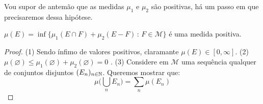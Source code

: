 \begin{problem}
    \label{prob:l1:4}
\end{problem}

Vou supor de antemão que as medidas $\mu_1$ e $\mu_2$ são positivas, há um passo em que precisaremos dessa hipótese.
\begin{prop}
    $\mu(E) = \inf \{\mu_1(E \cap F) +  \mu_2(E - F) \, : \, F \in \mathcal{M}\}$ é uma medida positiva.
\end{prop}
\begin{proof}
    (1) Sendo ínfimo de valores positivos, claramante $\mu(E) \in [0,\infty]$. (2) $\mu(\varnothing) \leq \mu_1(\varnothing) + \mu_2(\varnothing) = 0$ . (3) Considere em $\mathcal{M}$ uma sequência qualquer de conjuntos 
    disjuntos $(E_n)_{n \in \mathbb{N}}$. Queremos mostrar que:
    $$\mu \bigg(\bigcup_{n} E_n \bigg) = \sum_{n} \mu(E_n)$$


\end{proof}
